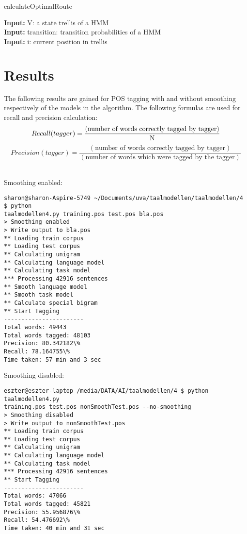 \documentclass[10pt, a4paper]{article}
\begin{document}
\begin{algorithm}[H]
\caption{calculateOptimalRoute}
\textbf{Input:} V: a state trellis of a HMM\\
\textbf{Input:} transition: transition probabilities of a HMM\\
\textbf{Input:} i: current position in trellis\\


\end{algorithm}

\section*{Results}
The following results are gained for POS tagging with and without smoothing respectively of the models in the algorithm. The following formulas are used for recall and precision calculation:
\begin{equation}
Recall(tagger) = \frac{(\text{number of words correctly tagged by tagger})}{\text{N}}\\
\end{equation}
\begin{equation}
Precision(tagger) = \frac{(\text{number of words correctly tagged by tagger})}{(\text{number of words which were tagged by the tagger})}
\end{equation}

\\
Smoothing enabled:
\begin{verbatim}
sharon@sharon-Aspire-5749 ~/Documents/uva/taalmodellen/taalmodellen/4 $ python 
taalmodellen4.py training.pos test.pos bla.pos
> Smoothing enabled
> Write output to bla.pos
** Loading train corpus
** Loading test corpus
** Calculating unigram
** Calculating language model
** Calculating task model
*** Processing 42916 sentences
** Smooth language model
** Smooth task model
** Calculate special bigram
** Start Tagging
-----------------------
Total words: 49443
Total words tagged: 48103
Precision: 80.342182\%
Recall: 78.164755\%
Time taken: 57 min and 3 sec
\end{verbatim}
Smoothing disabled:
\begin{verbatim}
eszter@eszter-laptop /media/DATA/AI/taalmodellen/4 $ python taalmodellen4.py 
training.pos test.pos nonSmoothTest.pos --no-smoothing
> Smoothing disabled
> Write output to nonSmoothTest.pos
** Loading train corpus
** Loading test corpus
** Calculating unigram
** Calculating language model
** Calculating task model
*** Processing 42916 sentences
** Start Tagging
-----------------------
Total words: 47066
Total words tagged: 45821
Precision: 55.956876\%
Recall: 54.476692\%
Time taken: 40 min and 31 sec
\end{verbatim}
\end{document}
